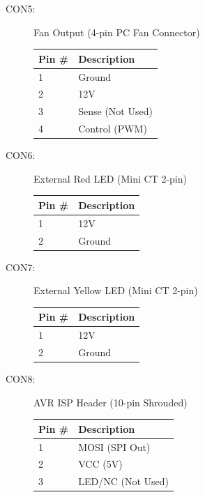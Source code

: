 \documentclass{article}
\begin{document}
\begin{description}
\begin{center}
\begin{tabular}{l|l}
        \end{tabular}
    \end{center}
  \item[CON5:] Fan Output (4-pin PC Fan Connector) \\
    \begin{center}
        \begin{tabular}{l|l}
            Pin \# & Description \\
            \hline
            1 & Ground \\
            2 & 12V \\
            3 & Sense (Not Used) \\
            4 & Control (PWM) \\
        \end{tabular}
    \end{center}
  \item[CON6:] External Red LED (Mini CT 2-pin) \\
    \begin{center}
        \begin{tabular}{l|l}
            Pin \# & Description \\
            \hline
            1 & 12V \\
            2 & Ground \\
        \end{tabular}
    \end{center}
  \item[CON7:] External Yellow LED (Mini CT 2-pin) \\
    \begin{center}
        \begin{tabular}{l|l}
            Pin \# & Description \\
            \hline
            1 & 12V \\
            2 & Ground \\
        \end{tabular}
    \end{center}
  \item[CON8:] AVR ISP Header (10-pin Shrouded) \\
    \begin{center}
        \begin{tabular}{l|l}
            Pin \# & Description \\
            \hline
            1  & MOSI (SPI Out) \\
            2  & VCC (5V) \\
            3  & LED/NC (Not Used) \\

\end{tabular}
\end{center}
\end{description}
\end{document}
